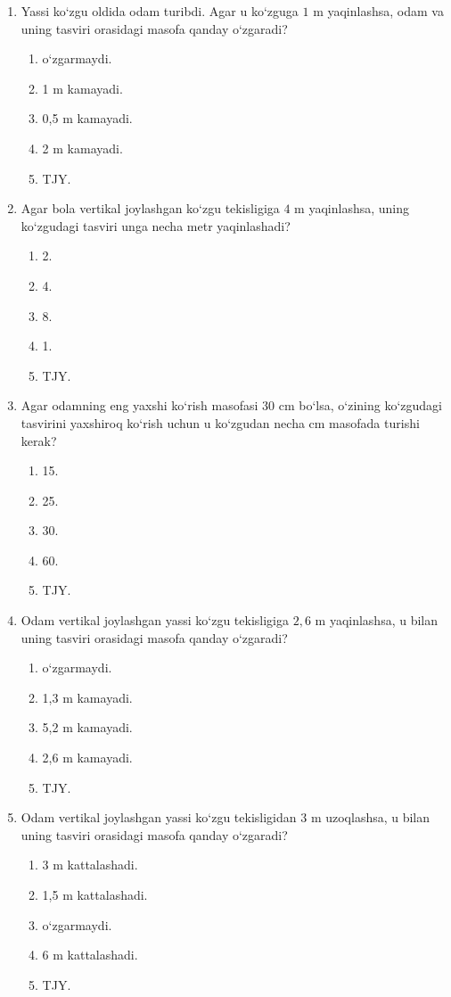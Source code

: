 \begin{enumerate}
\item Yassi ko‘zgu oldida odam turibdi. Agar u ko‘zguga $1$ m yaqinlashsa, odam va uning tasviri orasidagi masofa qanday o‘zgaradi?
\begin{enumerate}[label=\Alph*)]
\item o‘zgarmaydi.
\item 1 m kamayadi.
\item 0,5 m kamayadi.
\item 2 m kamayadi.
\item TJY.
\end{enumerate}

\item Agar bola vertikal joylashgan ko‘zgu tekisligiga $4$ m yaqinlashsa, uning ko‘zgudagi tasviri unga necha metr yaqinlashadi?
\begin{enumerate}[label=\Alph*)]
\item 2.
\item 4.
\item 8.
\item 1.
\item TJY.
\end{enumerate}

\item Agar odamning eng yaxshi ko‘rish masofasi $30$ cm bo‘lsa, o‘zining ko‘zgudagi tasvirini yaxshiroq ko‘rish uchun u ko‘zgudan necha cm masofada turishi kerak?
\begin{enumerate}[label=\Alph*)]
\item 15.
\item 25.
\item 30.
\item 60.
\item TJY.
\end{enumerate}

\item Odam vertikal joylashgan yassi ko‘zgu tekisligiga $2,6$ m yaqinlashsa, u bilan uning tasviri orasidagi masofa qanday o‘zgaradi?
\begin{enumerate}[label=\Alph*)]
\item o‘zgarmaydi.
\item 1,3 m kamayadi.
\item 5,2 m kamayadi.
\item 2,6 m kamayadi.
\item TJY.
\end{enumerate}

\item Odam vertikal joylashgan yassi ko‘zgu tekisligidan $3$ m uzoqlashsa, u bilan uning tasviri orasidagi masofa qanday o‘zgaradi?
\begin{enumerate}[label=\Alph*)]
\item 3 m kattalashadi.
\item 1,5 m kattalashadi.
\item o‘zgarmaydi.
\item 6 m kattalashadi.
\item TJY.
\end{enumerate}


\end{enumerate}
